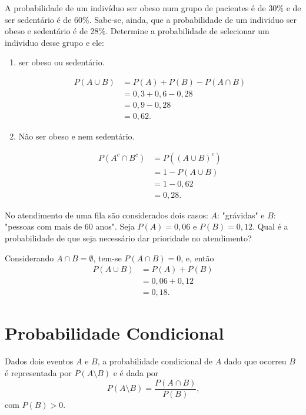 \begin{example}
	A probabilidade de um indivíduo ser obeso num grupo de pacientes é de 30\% e de ser sedentário é de 60\%. Sabe-se, ainda, que a probabilidade de um individuo ser obeso e sedentário é de 28\%. Determine a probabilidade de selecionar um individuo desse grupo e ele:
	
	\begin{enumerate}[label=\alph*)]
		\item ser obeso ou sedentário.
		
			\begin{align*}
				P(A\cup B)&=P(A)+P(B)-P(A\cap B)\\
						  &=0,3+0,6-0,28\\
						  &=0,9-0,28\\
						  &=0,62\text{.}
			\end{align*}
			
		\item Não ser obeso e nem sedentário.
		
			\begin{align*}
				P(A^c\cap B^c)&=P((A\cup B)^c)\\
							  &=1-P(A\cup B)\\
							  &=1-0,62\\
							  &=0,28\text{.}
			\end{align*}
	\end{enumerate}
\end{example}

\begin{example}
	No atendimento de uma fila são considerados dois casos: $A$: "grávidas" e $B$: "pessoas com mais de 60 anos". Seja $P(A)=0,06$ e $P(B)=0,12$. Qual é a probabilidade de que seja necessário dar prioridade no atendimento?
	
	Considerando $A\cap B=\emptyset$, tem-se $P(A\cap B)=0$, e, então
	\begin{align*}
		P(A\cup B)&=P(A)+P(B)\\
				  &=0,06+0,12\\
				  &=0,18\text{.}
	\end{align*}
\end{example}

\section{Probabilidade Condicional}

Dados dois eventos $A$ e $B$, a probabilidade condicional de $A$ dado que ocorreu $B$ é representada por $P(A\setminus B)$ e é dada por
\begin{equation}
	P(A\setminus B)=\frac{P(A\cap B)}{P(B)}\text{,}
\end{equation}
com $P(B)>0$.

